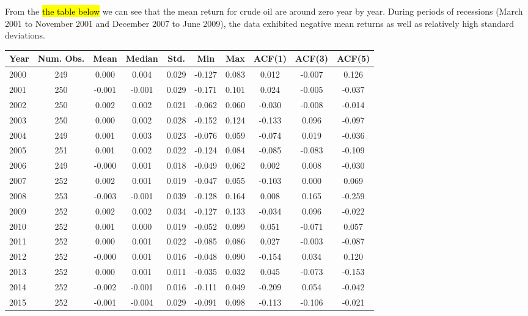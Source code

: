 \documentclass[12pt]{article}
\begin{document}
	\par From the \hl{the table below} we can see that the mean return for crude oil are around zero year by year. During periods of recessions (March 2001 to November 2001 and December 2007 to June 2009), the data exhibited negative mean returns as well as relatively high standard deviations.
	\begin{table}[H]
		\small
		\centering
		\begin{tabular}{l|c c c c c c c c c}
			\toprule
			Year & Num. Obs. & Mean & Median & Std. & Min & Max & ACF(1) & ACF(3) & ACF(5) \\
			\midrule
			2000 & 249 & 0.000 & 0.004 & 0.029 & -0.127 & 0.083 & 0.012 & -0.007 & 0.126 \\
			2001 & 250 & -0.001 & -0.001 & 0.029 & -0.171 & 0.101 & 0.024 & -0.005 & -0.037 \\
			2002 & 250 & 0.002 & 0.002 & 0.021 & -0.062 & 0.060 & -0.030 & -0.008 & -0.014 \\
			2003 & 250 & 0.000 & 0.002 & 0.028 & -0.152 & 0.124 & -0.133 & 0.096 & -0.097 \\
			2004 & 249 & 0.001 & 0.003 & 0.023 & -0.076 & 0.059 & -0.074 & 0.019 & -0.036 \\
			2005 & 251 & 0.001 & 0.002 & 0.022 & -0.124 & 0.084 & -0.085 & -0.083 & -0.109 \\
			2006 & 249 & -0.000 & 0.001 & 0.018 & -0.049 & 0.062 & 0.002 & 0.008 & -0.030 \\
			2007 & 252 & 0.002 & 0.001 & 0.019 & -0.047 & 0.055 & -0.103 & 0.000 & 0.069 \\
			2008 & 253 & -0.003 & -0.001 & 0.039 & -0.128 & 0.164 & 0.008 & 0.165 & -0.259 \\
			2009 & 252 & 0.002 & 0.002 & 0.034 & -0.127 & 0.133 & -0.034 & 0.096 & -0.022 \\
			2010 & 252 & 0.001 & 0.000 & 0.019 & -0.052 & 0.099 & 0.051 & -0.071 & 0.057 \\
			2011 & 252 & 0.000 & 0.001 & 0.022 & -0.085 & 0.086 & 0.027 & -0.003 & -0.087 \\
			2012 & 252 & -0.000 & 0.001 & 0.016 & -0.048 & 0.090 & -0.154 & 0.034 & 0.120 \\
			2013 & 252 & 0.000 & 0.001 & 0.011 & -0.035 & 0.032 & 0.045 & -0.073 & -0.153 \\
			2014 & 252 & -0.002 & -0.001 & 0.016 & -0.111 & 0.049 & -0.209 & 0.054 & -0.042 \\
			2015 & 252 & -0.001 & -0.004 & 0.029 & -0.091 & 0.098 & -0.113 & -0.106 & -0.021 \\

\end{tabular}
\end{table}
\end{document}
